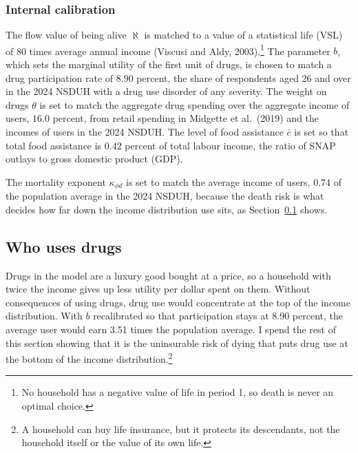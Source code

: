 \documentclass[10pt]{article}
\begin{document}
\subsubsection{Internal calibration}

The flow value
of being alive $\aleph$ is matched to a value of a statistical life (VSL) of 80
times average annual income (Viscusi and Aldy, 2003).\footnote{No household has a negative value of life in period 1, so death is never an optimal choice.} The parameter $b$, which sets the marginal utility of the first unit of drugs, is chosen to match a drug participation rate of
$8.90$ percent, the share of respondents aged 26 and over in the 2024 NSDUH with a drug use disorder of any severity. The weight on drugs $\theta$ is set to match the aggregate drug spending over the
aggregate income of users, $16.0$ percent, from retail spending in Midgette et al.\ (2019) and the incomes of users in
the 2024 NSDUH. The level of food assistance $\bar c$ is set so that total food assistance is $0.42$ percent of total labour income, the ratio of SNAP outlays to gross domestic product (GDP).

The mortality exponent $\kappa_{\phi d}$ is set to match the average income of users,
$0.74$ of the population average in the 2024 NSDUH, because the death risk is what decides how far down
the income distribution use sits, as Section~\ref{sec:who} shows.

\begin{table}[!tb]
\centering
\caption{Externally set parameters}\label{tab:ext}
\sbox{\ntbox}{}\usebox{\ntbox}
\end{table}

\begin{table}[!tb]
\centering
\caption{Internally calibrated parameters}\label{tab:int}
\sbox{\ntbox}{}\usebox{\ntbox}
\end{table}

\subsection{Who uses drugs}\label{sec:who}

Drugs in the model are a luxury good bought at a price, so a household with
twice the income gives up less utility per dollar spent on them.   Without consequences of using drugs, drug use would concentrate at the top of the income distribution. With $b$ recalibrated so that participation stays at $8.90$ percent, the average user would earn 3.51 times the population average. I spend the rest of this section showing that it is the uninsurable risk of dying that puts drug use at the bottom of the income distribution.\footnote{A household can buy life insurance, but it protects its descendants, not the household itself or the value of its own life.}
\end{document}
